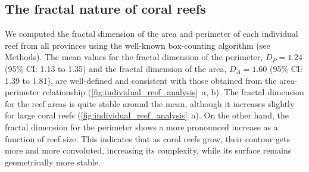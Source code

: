 \subsection{The fractal nature of coral reefs}

We computed the fractal dimension of the area and perimeter of each
individual reef from all provinces using the well-known box-counting algorithm
(see Methods). The mean values for the fractal dimension of the perimeter,
$D_P=1.24$ (95\% CI: 1.13 to 1.35) and the fractal dimension of the area,
$D_A=1.60$ (95\% CI: 1.39 to 1.81), are well-defined and consistent with those
obtained from the area-perimeter relationship
(\cref{fig:individual_reef_analysis}~\textcolor{ref_color}{a, b}). The fractal
dimension for the reef
areas is quite stable around the mean, although it increases slightly for large
coral reefs (\cref{fig:individual_reef_analysis}~\textcolor{ref_color}{a}). On
the other hand, the
fractal dimension for the perimeter shows a more pronounced increase as
a function of reef size. This indicates that as coral reefs grow, their contour
gets more and more convoluted, increasing its complexity, while its surface
remains geometrically more stable.

